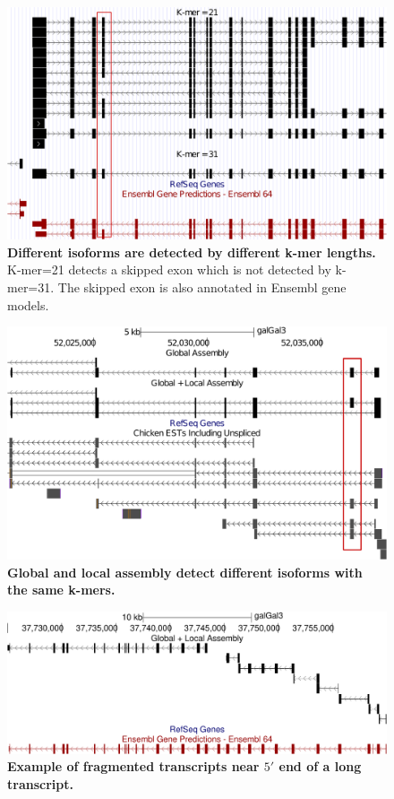 \documentclass[10pt]{article}
\begin{document}
\begin{figure}[!ht]
\begin{center}
\includegraphics[width=5in]{kmers-variance.pdf}
\end{center}
\caption{
{\bf Different isoforms are detected by different k-mer lengths.}
K-mer=21 detects a skipped exon which is not detected by k-mer=31.
The skipped exon is also annotated in Ensembl gene models.
}
\label{kmer-variance}
\end{figure}

\begin{figure}[!ht]
\begin{center}
\includegraphics[width=5in]{global_vs_local.pdf}
\end{center}
\caption{
{\bf Global and local assembly detect different isoforms with the same k-mers.} 
}
\label{global_vs_local}
\end{figure}

\begin{figure}[!ht]
\begin{center}
\includegraphics[width=5in]{fragmented_transcripts.pdf}
\end{center}
\caption{
{\bf Example of fragmented transcripts near $5'$ end of a long transcript.}
}
\label{fragmented_transcripts}
\end{figure}
\end{document}
